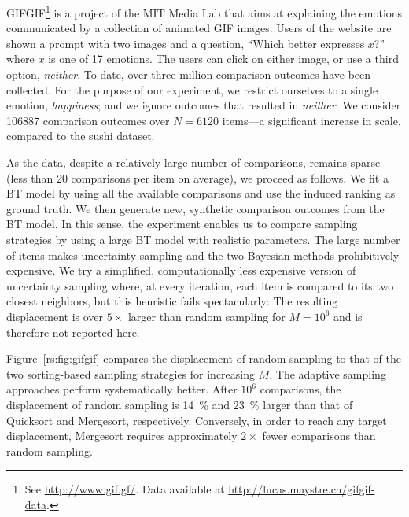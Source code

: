 GIFGIF\footnote{See \url{http://www.gif.gf/}.
Data available at \url{http://lucas.maystre.ch/gifgif-data}.} is a project of the MIT Media Lab that aims at explaining the emotions communicated by a collection of animated GIF images.
Users of the website are shown a prompt with two images and a question, ``Which better expresses $x$?'' where $x$ is one of 17 emotions.
The users can click on either image, or use a third option, \emph{neither}.
To date, over three million comparison outcomes have been collected.
For the purpose of our experiment, we restrict ourselves to a single emotion, \emph{happiness}; and we ignore outcomes that resulted in \emph{neither}.
We consider \num{106887} comparison outcomes over $N = \num{6120}$ items---a significant increase in scale, compared to the sushi dataset.

As the data, despite a relatively large number of comparisons, remains sparse (less than 20 comparisons per item on average), we proceed as follows.
We fit a BT model by using all the available comparisons and use the induced ranking as ground truth.
We then generate new, synthetic comparison outcomes from the BT model.
In this sense, the experiment enables us to compare sampling strategies by using a large BT model with realistic parameters.
The large number of items makes uncertainty sampling and the two Bayesian methods prohibitively expensive.
We try a simplified, computationally less expensive version of uncertainty sampling where, at every iteration, each item is compared to its two closest neighbors, but this heuristic fails spectacularly: The resulting displacement is over $5\times$ larger than random sampling for $M = 10^6$ and is therefore not reported here.

Figure~\ref{rs:fig:gifgif} compares the displacement of random sampling to that of the two sorting-based sampling strategies for increasing $M$.
The adaptive sampling approaches perform systematically better.
After $10^6$ comparisons, the displacement of random sampling is \num{14}~\% and \num{23}~\% larger than that of Quicksort and Mergesort, respectively.
Conversely, in order to reach any target displacement, Mergesort requires approximately $2 \times$ fewer comparisons than random sampling.
